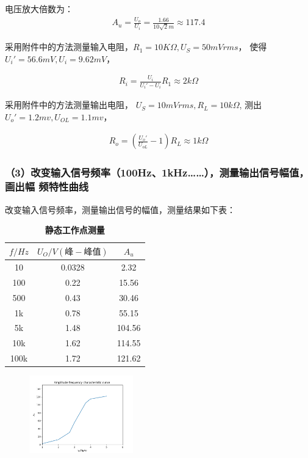 \documentclass[UTF8]{ctexart}
\begin{document}
电压放大倍数为：
\begin{align}
        A_u = \frac{U_o}{U_i} = \frac{1.66}{10\sqrt{2}m} \approx 117.4  
\end{align}


采用附件中的方法测量输入电阻，$R_1 = 10K\Omega,U_S = 50mVrms$，
使得$U_i' = 56.6mV, U_i = 9.62mV$，

\begin{align}
        R_i = \frac{U_i}{U_i' - U_i}R_1 \approx 2k \Omega
\end{align}

采用附件中的方法测量输出电阻，
$U_S = 10mVrms, R_L=10k\Omega $,
测出$U_o' =1.2mv ,U_{OL} = 1.1mv$，

\begin{align}
        R_o = (\frac{U_o'}{U_{oL}} - 1)R_L \approx 1k\Omega
\end{align}

\subsubsection*{（3）改变输入信号频率（100Hz、1kHz……），测量输出信号幅值，画出幅
频特性曲线}

改变输入信号频率，测量输出信号的幅值，测量结果如下表：

\begin{table}[H]
        \centering
        \caption{\label{表4}\textbf{静态工作点测量}}
        \begin{tabular}{ccc}
        \toprule
                $f/Hz$ & $U_O/V(峰-峰值)$ & $A_u$\\
        \midrule
                10 & 0.0328 & 2.32\\ 
                100 & 0.22 & 15.56\\
                500 & 0.43 & 30.46\\
                1k & 0.78 & 55.15\\
                5k & 1.48 & 104.56\\
                10k & 1.62 & 114.55\\
                100k & 1.72 & 121.62\\
        \bottomrule
        \end{tabular}
\end{table}

\begin{figure}[htbp]
        \centering
        \includegraphics[width=0.40\textwidth]{幅频特性曲线.png}
\end{figure}
\end{document}
